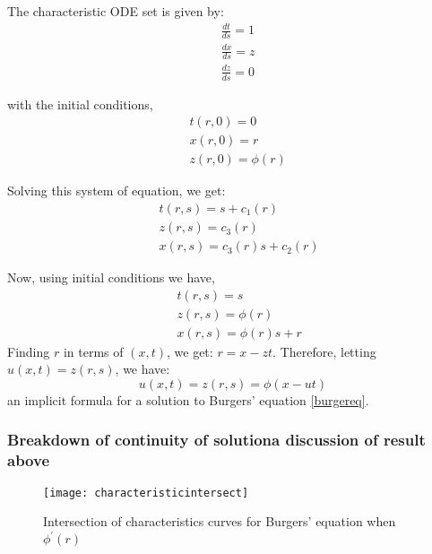 \documentclass[11pt, a4paper]{report}
\begin{document}
The characteristic ODE set is given by:
\begin{equation*}
    \begin{aligned}
        & \frac{dt}{ds} = 1\\
        & \frac{dx}{ds} = z\\
        & \frac{dz}{ds} = 0    
    \end{aligned}
\end{equation*}

with the initial conditions,
\begin{equation*}
    \begin{aligned}
        & t(r, 0) = 0\\[-0.5em]
        & x(r, 0) = r\\[-0.5em]
        & z(r, 0) = \phi(r)
    \end{aligned}
\end{equation*}

Solving this system of equation, we get:
\begin{equation*}\
    \begin{aligned}
        & t(r,s) = s + c_1(r)\\[-0.5em]
        & z(r,s) = c_3(r)\\[-0.5em]
        & x(r,s) = c_3(r)s + c_2(r)
    \end{aligned}
\end{equation*}

Now, using initial conditions we have,
\begin{equation*}\
    \begin{aligned}
        & t(r,s) = s\\[-0.5em]
        & z(r,s) = \phi(r)\\[-0.5em]
        & x(r,s) = \phi(r)s + r
    \end{aligned}
\end{equation*}
Finding $r$ in terms of $(x, t)$, we get: $r = x - zt$. Therefore, letting $u(x,t) = z(r, s)$, we have:
\begin{equation*}
    u(x, t) = z(r, s) = \phi(x-ut)
\end{equation*}
an implicit formula for a solution to Burgers' equation \eqref{burgereq}.

\subsubsection{Breakdown of continuity of solution\textemdash a discussion of result above} 

\begin{figure}[h]
    \centering
    \texttt{[image: characteristicintersect]}
    \caption{Intersection of characteristics curves for Burgers' equation when $\phi^{\prime}(r)$}
    \label{fig:characteristicintersect}
\end{figure}
\end{document}
